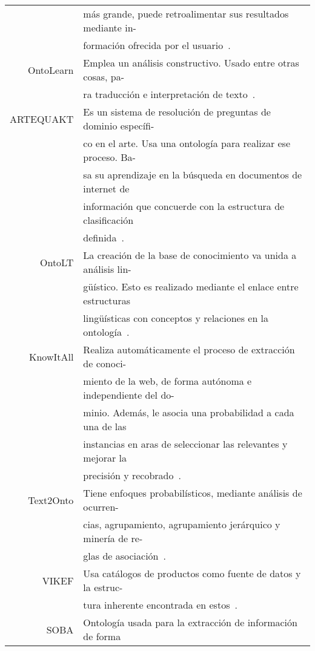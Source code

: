 \begin{table}[H]
	\begin{tabular}{rl}
		& más grande, puede retroalimentar sus resultados mediante in- \\
		& formación ofrecida por el usuario~\cite{ref:60}.\\
		OntoLearn & Emplea un análisis constructivo. Usado entre otras cosas, pa- \\
		& ra traducción e interpretación de texto~\cite{ref:64,ref:63,ref:62,ref:61}.\\
		ARTEQUAKT & Es un sistema de resolución de preguntas de dominio específi- \\
		& co en el arte. Usa una ontología para realizar ese proceso. Ba- \\
		& sa su aprendizaje en la búsqueda en documentos de internet de \\
		& información que concuerde con la estructura de clasificación \\
		& definida~\cite{ref:65}.\\
		OntoLT & La creación de la base de conocimiento va unida a análisis lin- \\
		& güístico. Esto es realizado mediante el enlace entre estructuras \\
		& lingüísticas con conceptos y relaciones en la ontología~\cite{ref:66}.\\
		KnowItAll & Realiza automáticamente el proceso de extracción de conoci- \\
		& miento de la web, de forma autónoma e independiente del do- \\
		& minio. Además, le asocia una probabilidad a cada una de las \\
		& instancias en aras de seleccionar las relevantes y mejorar la \\
		& precisión y recobrado~\cite{ref:67}.\\
		Text2Onto & Tiene enfoques probabilísticos, mediante análisis de ocurren- \\
		& cias, agrupamiento, agrupamiento jerárquico y minería de re-\\
		& glas de asociación~\cite{ref:70,ref:71,ref:69,ref:68}. \\
		VIKEF & Usa catálogos de productos como fuente de datos y la estruc- \\
		& tura inherente encontrada en estos~\cite{ref:34,ref:72}.\\
		SOBA & Ontología usada para la extracción de información de forma \\

\end{tabular}
\end{table}
